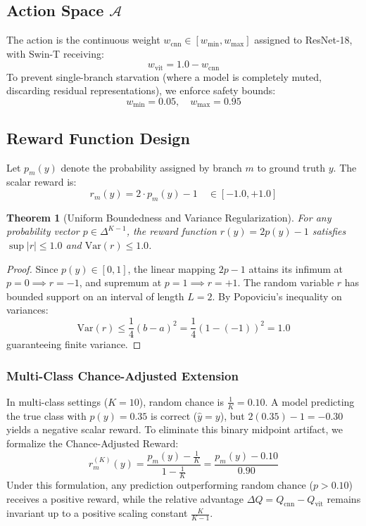 \documentclass[10pt,journal,compsoc]{IEEEtran}
\newtheorem{theorem}{Theorem}
\begin{document}
\subsection{Action Space $\mathcal{A}$}
The action is the continuous weight $w_{\text{cnn}} \in [w_{\min}, w_{\max}]$ assigned to ResNet-18, with Swin-T receiving:
\begin{equation}
w_{\text{vit}} = 1.0 - w_{\text{cnn}}
\end{equation}
To prevent single-branch starvation (where a model is completely muted, discarding residual representations), we enforce safety bounds:
\begin{equation}
w_{\min} = 0.05, \quad w_{\max} = 0.95
\end{equation}

\subsection{Reward Function Design}
Let $p_m(y)$ denote the probability assigned by branch $m$ to ground truth $y$. The scalar reward is:
\begin{equation}
r_m(y) = 2 \cdot p_m(y) - 1 \quad \in [-1.0, +1.0]
\end{equation}

\begin{theorem}[Uniform Boundedness and Variance Regularization]
For any probability vector $p \in \Delta^{K-1}$, the reward function $r(y) = 2p(y) - 1$ satisfies $\sup |r| \le 1.0$ and $\text{Var}(r) \le 1.0$.
\end{theorem}
\begin{proof}
Since $p(y) \in [0, 1]$, the linear mapping $2p - 1$ attains its infimum at $p=0 \implies r = -1$, and supremum at $p=1 \implies r = +1$. The random variable $r$ has bounded support on an interval of length $L = 2$. By Popoviciu's inequality on variances:
\begin{equation}
\text{Var}(r) \le \frac{1}{4} (b - a)^2 = \frac{1}{4} (1 - (-1))^2 = 1.0
\end{equation}
guaranteeing finite variance.
\end{proof}

\subsubsection{Multi-Class Chance-Adjusted Extension}
In multi-class settings ($K=10$), random chance is $\frac{1}{K} = 0.10$. A model predicting the true class with $p(y) = 0.35$ is correct ($\hat{y} = y$), but $2(0.35) - 1 = -0.30$ yields a negative scalar reward. To eliminate this binary midpoint artifact, we formalize the Chance-Adjusted Reward:
\begin{equation}
r_m^{(K)}(y) = \frac{p_m(y) - \frac{1}{K}}{1 - \frac{1}{K}} = \frac{p_m(y) - 0.10}{0.90}
\end{equation}
Under this formulation, any prediction outperforming random chance ($p > 0.10$) receives a positive reward, while the relative advantage $\Delta Q = Q_{\text{cnn}} - Q_{\text{vit}}$ remains invariant up to a positive scaling constant $\frac{K}{K-1}$.
\end{document}
